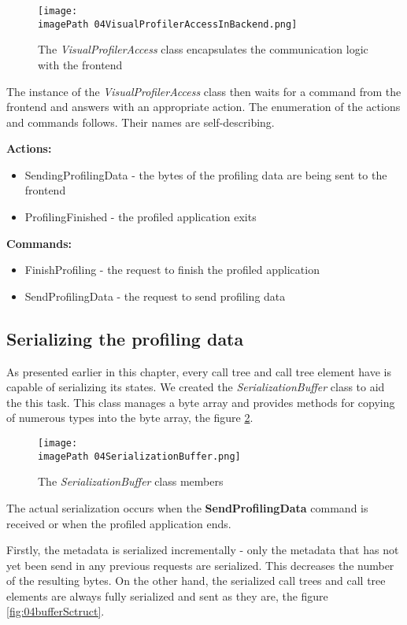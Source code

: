 \begin{figure}
	\centering
		\texttt{[image: \\imagePath 04VisualProfilerAccessInBackend.png]}
		\caption{The \textit{VisualProfilerAccess} class encapsulates the communication logic with the frontend}
	\label{fig:04VisualProfilerAccessInBackend}
\end{figure}

The instance of the \textit{VisualProfilerAccess} class then waits for a command from the frontend and answers with an appropriate action. The enumeration of the actions and commands follows. Their names are self-describing.

\textbf{Actions:}
\begin{itemize}	
\item	SendingProfilingData - the bytes of the profiling data are being sent to the frontend
\item	ProfilingFinished - the profiled application exits
\end{itemize}

\textbf{Commands:}
\begin{itemize}	
\item	FinishProfiling - the request to finish the profiled application
\item	SendProfilingData - the request to send profiling data
\end{itemize}

\subsection{Serializing the profiling data}
As presented earlier in this chapter, every call tree and call tree element have is capable of serializing its states. We created the \textit{SerializationBuffer} class to aid the this task. This class manages a byte array and provides methods for copying of numerous types into the byte array, the figure \ref{fig:04SerializationBuffer}.

\begin{figure}
	\centering
		\texttt{[image: \\imagePath 04SerializationBuffer.png]}
		\caption{The \textit{SerializationBuffer} class members}
	\label{fig:04SerializationBuffer}
\end{figure}

The actual serialization occurs when the \textbf{SendProfilingData} command is received or when the profiled application ends. 

Firstly, the metadata is serialized incrementally - only the metadata that has not yet been send in any previous requests are serialized. This decreases the number of the resulting bytes. On the other hand, the serialized call trees and call tree elements are always fully serialized and sent as they are, the figure \ref{fig:04bufferSctruct}.

